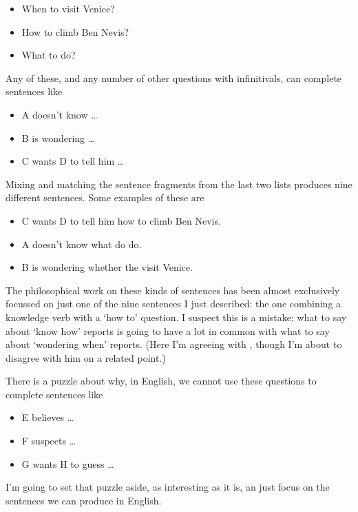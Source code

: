 \documentclass[11pt,]{book}
\providecommand{\tightlist}{%
  \setlength{\itemsep}{0pt}\setlength{\parskip}{0pt}}
\begin{document}
\begin{itemize}
\tightlist
\item
  When to visit Venice?
\item
  How to climb Ben Nevis?
\item
  What to do?
\end{itemize}

Any of these, and any number of other questions with infinitivals, can complete sentences like

\begin{itemize}
\tightlist
\item
  A doesn't know \ldots{}
\item
  B is wondering \ldots{}
\item
  C wants D to tell him \ldots{}
\end{itemize}

Mixing and matching the sentence fragments from the last two lists produces nine different sentences. Some examples of these are

\begin{itemize}
\tightlist
\item
  C wants D to tell him how to climb Ben Nevis.
\item
  A doesn't know what do do.
\item
  B is wondering whether the visit Venice.
\end{itemize}

The philosophical work on these kinds of sentences has been almost exclusively focussed on just one of the nine sentences I just described: the one combining a knowledge verb with a `how to' question. I suspect this is a mistake; what to say about `know how' reports is going to have a lot in common with what to say about `wondering when' reports. (Here I'm agreeing with \citet{Stanley2011}, though I'm about to disagree with him on a related point.)

There is a puzzle about why, in English, we cannot use these questions to complete sentences like

\begin{itemize}
\tightlist
\item
  E believes \ldots{}
\item
  F suspects \ldots{}
\item
  G wants H to guess \ldots{}
\end{itemize}

I'm going to set that puzzle aside, as interesting as it is, an just focus on the sentences we can produce in English.
\end{document}
